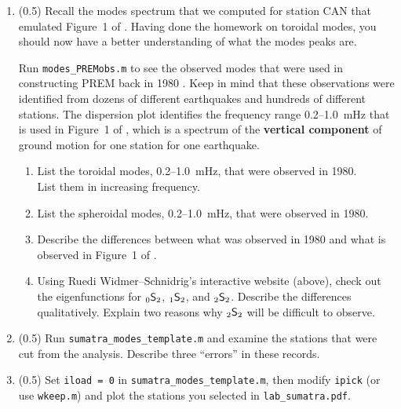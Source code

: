 \documentclass[11pt,titlepage,fleqn]{article}
\newcommand{\snl}[2]{\mbox{$_{#1}\ssS_{#2}$}}
\begin{document}
\begin{enumerate}
\item (0.5) Recall the modes spectrum that we computed for station CAN that emulated Figure~1 of \citet{Park2005}. Having done the homework on toroidal modes, you should now have a better understanding of what the modes peaks are.

Run \verb+modes_PREMobs.m+ to see the observed modes that were used in constructing PREM back in 1980 \citep{PREM}. Keep in mind that these observations were identified from dozens of different earthquakes and hundreds of different stations.
The dispersion plot identifies the frequency range 0.2--1.0~mHz that is used in Figure~1 of \citet{Park2005}, which is a spectrum of the {\bf vertical component} of ground motion for one station for one earthquake.
%
\begin{enumerate}
\item List the toroidal modes, 0.2--1.0~mHz, that were observed in 1980. \\
List them in increasing frequency.
\item List the spheroidal modes, 0.2--1.0~mHz, that were observed in 1980.
\item Describe the differences between what was observed in 1980 and what is observed in Figure~1 of \citet{Park2005}.
\item Using Ruedi Widmer--Schnidrig's interactive website (above), check out the eigenfunctions for \snl{0}{2}, \snl{1}{2}, and \snl{2}{2}. Describe the differences qualitatively. Explain two reasons why \snl{2}{2} will be difficult to observe.
\end{enumerate}


\item (0.5) Run \verb+sumatra_modes_template.m+ and examine the stations that were cut from the analysis. Describe three ``errors'' in these records.


\item (0.5) Set \verb+iload = 0+ in \verb+sumatra_modes_template.m+, then modify \verb+ipick+ (or use \verb+wkeep.m+) and plot the stations you selected in \verb+lab_sumatra.pdf+.


\end{enumerate}
\end{document}
